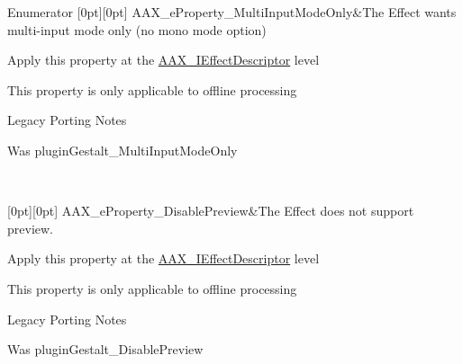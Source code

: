 \begin{DoxyEnumFields}{Enumerator}
[0pt][0pt]{}\mbox{\label{a00662_a13e384f22825afd3db6d68395b79ce0daa15cf3edd899af4a98fa18fcdfdeb9d6}} 
A\+A\+X\+\_\+e\+Property\+\_\+\+Multi\+Input\+Mode\+Only&The Effect wants multi-\/input mode only (no mono mode option) \begin{DoxyItemize}
\item Apply this property at the \mbox{\hyperlink{a01813}{A\+A\+X\+\_\+\+I\+Effect\+Descriptor}} level \item This property is only applicable to offline processing\end{DoxyItemize}
\begin{DoxyRefDesc}{Legacy Porting Notes}
\item[\mbox{\hyperlink{a00787__porting_notes000054}{Legacy Porting Notes}}]Was plugin\+Gestalt\+\_\+\+Multi\+Input\+Mode\+Only \end{DoxyRefDesc}
\\
\hline

[0pt][0pt]{}\mbox{\label{a00662_a13e384f22825afd3db6d68395b79ce0da854fdc19ab908b67aa3bc1f4262aa288}} 
A\+A\+X\+\_\+e\+Property\+\_\+\+Disable\+Preview&The Effect does not support preview. \begin{DoxyItemize}
\item Apply this property at the \mbox{\hyperlink{a01813}{A\+A\+X\+\_\+\+I\+Effect\+Descriptor}} level \item This property is only applicable to offline processing\end{DoxyItemize}
\begin{DoxyRefDesc}{Legacy Porting Notes}
\item[\mbox{\hyperlink{a00787__porting_notes000055}{Legacy Porting Notes}}]Was plugin\+Gestalt\+\_\+\+Disable\+Preview \end{DoxyRefDesc}
\\
\hline


\end{DoxyEnumFields}
